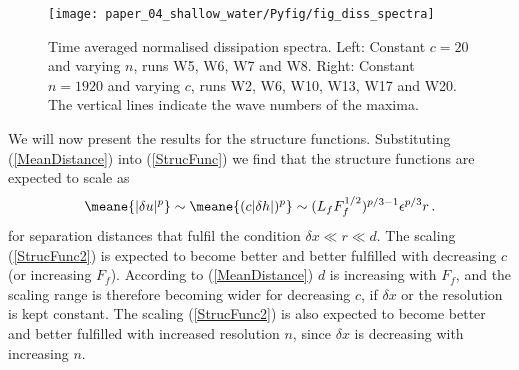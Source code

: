 \begin{figure}
\centerline{\texttt{[image: paper\_04\_shallow\_water/Pyfig/fig\_diss\_spectra]}}
\caption{Time averaged normalised dissipation spectra. Left: Constant $ c = 20 $ and varying $ n $, runs  W5, W6, W7 and W8. Right: Constant $ n= 1920 $ and varying $ c $, runs W2, W6, W10, W13, W17 and W20. The vertical lines indicate the wave numbers of the maxima.}
\label{fig_disspectra}
\end{figure}



We will now present the results for the structure functions. Substituting
(\ref{MeanDistance}) into (\ref{StrucFunc}) we find that the structure
functions are expected to scale as
\begin{equation} \label{StrucFunc2}
\meane{|\delta u |^p}  \sim \meane{(c|\delta h |)^p} \sim  (L_f F_f^{1/2})^{p/3-1}  \epsilon^{p/3}  r  \, .
\end{equation}
for separation distances that fulfil the condition $ \delta x \ll r \ll d $.
The scaling (\ref{StrucFunc2}) is
expected to become better and better fulfilled with decreasing $ c $ (or
increasing $ F_f $). According to (\ref{MeanDistance})
$ d $ is increasing with $ F_f $, and the scaling range is therefore becoming
wider for decreasing $ c $, if $ \delta x $ or the resolution  is kept
constant. The scaling
(\ref{StrucFunc2}) is also expected to become better and better fulfilled with
increased resolution $ n $, since $ \delta x $ is decreasing with increasing $
n $.

